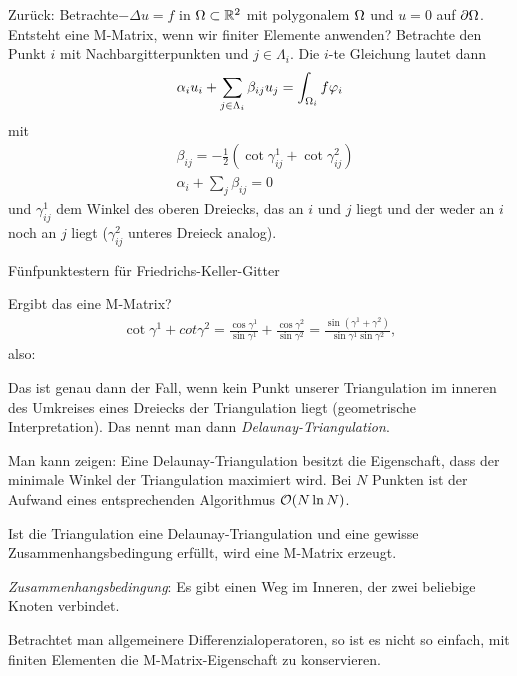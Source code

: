 Zurück:  Betrachte$- \Delta u = f$ in $\Omega \subset \mathbb{R}^2$ mit polygonalem $\Omega$ und $u = 0$ auf $\partial \Omega$. Entsteht eine M-Matrix, wenn wir  finiter Elemente anwenden?
Betrachte den Punkt $i$ mit Nachbargitterpunkten und $j \in \Lambda_i$. Die $i$-te Gleichung lautet dann
\begin{align*}
  \alpha_i u_i + \sum_{j \in \Lambda_i} \beta_{ij}u_j = \int_{\Omega_i} f \varphi_i
\end{align*}
mit
\begin{align*}
&  \beta_{ij} = -\frac 1 2 \left( \cot\gamma_{ij}^1 + \cot \gamma_{ij}^2\right)\\
&\alpha_i + \sum_j \beta_{ij} = 0
\end{align*}
und $\gamma_{ij}^1$ dem Winkel des oberen Dreiecks, das an $i$ und $j$ liegt und der weder an $i$ noch an $j$ liegt ($\gamma_{ij}^2$ unteres Dreieck analog).
\begin{beispiel*}
  Fünfpunktestern für Friedrichs-Keller-Gitter
\end{beispiel*}
Ergibt das eine M-Matrix?
\begin{align*}
  \cot \gamma^1 + cot \gamma^2 = \frac {\cos \gamma ^1}{\sin \gamma^1} + \frac {\cos \gamma ^2}{\sin \gamma^2} = \frac {\sin(\gamma^1 + \gamma^2)}{\sin \gamma^1 \sin \gamma^2}, 
\end{align*}
also: \begin{center}
\end{center}
Das ist genau dann der Fall, wenn kein Punkt unserer Triangulation im inneren des Umkreises eines Dreiecks der Triangulation liegt (geometrische Interpretation). Das nennt man dann \emph{Delaunay-Triangulation}. 

Man kann zeigen: Eine Delaunay-Triangulation besitzt die Eigenschaft, dass der minimale Winkel der Triangulation maximiert wird. Bei $N$ Punkten ist der Aufwand eines entsprechenden Algorithmus ${\cal O}(N \ln N)$. 

Ist die Triangulation eine  Delaunay-Triangulation und eine gewisse Zusammenhangsbedingung erfüllt, wird eine M-Matrix erzeugt. 

\emph{Zusammenhangsbedingung}: Es gibt einen Weg im Inneren, der zwei beliebige Knoten verbindet.

\begin{bemerkung}
  Betrachtet man allgemeinere Differenzialoperatoren, so ist es nicht so einfach, mit finiten Elementen die M-Matrix-Eigenschaft zu konservieren. 
\end{bemerkung}

